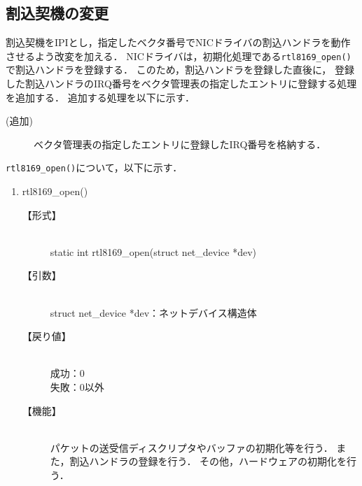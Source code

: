 \documentclass[12pt]{jsarticle}
\begin{document}
\subsection{割込契機の変更}
割込契機をIPIとし，指定したベクタ番号でNICドライバの割込ハンドラを動作させるよう改変を加える．
NICドライバは，初期化処理である{\tt rtl8169\_open()}で割込ハンドラを登録する．
このため，割込ハンドラを登録した直後に，
登録した割込ハンドラのIRQ番号をベクタ管理表の指定したエントリに登録する処理を追加する．
追加する処理を以下に示す．
\begin{description}
    \item[(追加)]ベクタ管理表の指定したエントリに登録したIRQ番号を格納する．
\end{description}
{\tt rtl8169\_open()}について，以下に示す．
\begin{enumerate}
    \item rtl8169\_open()
        \begin{description}
            \item[【形式】]\mbox{}\\
                static int rtl8169\_open(struct net\_device *dev)
            \item[【引数】]\mbox{}\\
                struct net\_device *dev：ネットデバイス構造体
            \item[【戻り値】]\mbox{}\\
                成功：0\\
                失敗：0以外
            \item[【機能】]\mbox{}\\
                パケットの送受信ディスクリプタやバッファの初期化等を行う．
                また，割込ハンドラの登録を行う．
                その他，ハードウェアの初期化を行う．
        \end{description}
\end{enumerate}
\end{document}
